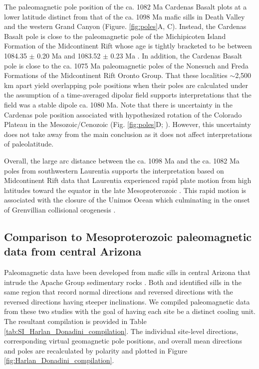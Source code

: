 The paleomagnetic pole position of the ca. 1082 Ma Cardenas Basalt plots at a lower latitude distinct from that of the ca. 1098 Ma mafic sills in Death Valley and the western Grand Canyon (Figure. \ref{fig:poles}A, C). Instead, the Cardenas Basalt pole is close to the paleomagnetic pole of the Michipicoten Island Formation of the Midcontinent Rift whose age is tightly bracketed to be between 1084.35 $\pm$ 0.20 Ma and 1083.52 $\pm$ 0.23 Ma \citep{Fairchild2017a}. In addition, the Cardenas Basalt pole is close to the ca. 1075 Ma paleomagnetic poles of the Nonesuch and Freda Formations \citep{Henry1977a, Slotznick2023a} of the Midcontinent Rift Oronto Group. That these localities $\sim$2,500 km apart yield overlapping pole positions when their poles are calculated under the assumption of a time-averaged dipolar field supports interpretations that the field was a stable dipole ca. 1080 Ma. Note that there is uncertainty in the Cardenas pole position associated with hypothesized rotation of the Colorado Plateau in the Mesozoic/Cenozoic (Fig. \ref{fig:poles}D; \citealp[e.g.][]{Bryan1990a}). However, this uncertainty does not take away from the main conclusion as it does not affect interpretations of paleolatitude.

Overall, the large arc distance between the ca. 1098 Ma and the ca. 1082 Ma poles from southwestern Laurentia supports the interpretation based on Midcontinent Rift data that Laurentia experienced rapid plate motion from high latitudes toward the equator in the late Mesoproterozoic \citep{Davis1997a, Swanson-Hysell2009a}. This rapid motion is associated with the closure of the Unimos Ocean which culminating in the onset of Grenvillian collisional orogenesis \citep{Swanson-Hysell2023a}. 

\subsection{Comparison to Mesoproterozoic paleomagnetic data from central Arizona}

Paleomagnetic data have been developed from mafic sills in central Arizona that intrude the Apache Group sedimentary rocks \citep{Helsley1972a, Harlan1993a, Donadini2011a}. Both \cite{Harlan1993a} and \cite{Donadini2011a} identified sills in the same region that record normal directions and reversed directions with the reversed directions having steeper inclinations. We compiled paleomagnetic data from these two studies with the goal of having each site be a distinct cooling unit. The resultant compilation is provided in Table \ref{tab:SI_Harlan_Donadini_compilation}. The individual site-level directions, corresponding virtual geomagnetic pole positions, and overall mean directions and poles are recalculated by polarity and plotted in Figure \ref{fig:Harlan_Donadini_compilation}. 

